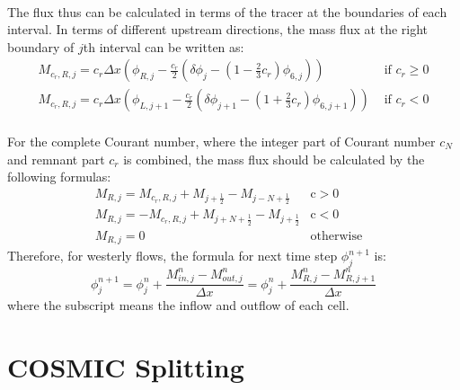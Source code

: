 \paragraph{}
The flux thus can be calculated in terms of the tracer at the boundaries of each interval. In terms of different upstream directions, the mass flux at the right boundary of $j$th interval can be written as:
\begin{eqnarray} \label{eq:2.10}
M_{c_r,R,j} = c_r \Delta x (\phi_{R,j}-\frac{c_r}{2}(\delta \phi_j-(1-\frac{2}{3} c_r)\phi_{6,j})) & \text{ if $c_r$}\geqslant 0 \nonumber \\
M_{c_r,R,j} = c_r \Delta x (\phi_{L,j+1}-\frac{c_r}{2}(\delta \phi_{j+1}-(1+\frac{2}{3} c_r)\phi_{6,j+1})) & \text{ if  $c_r$} < 0
\end{eqnarray}
\paragraph{}
For the complete Courant number, where the integer part of Courant number $c_N$ and remnant part $c_r$ is combined, the mass flux should be calculated by the following formulas:
\begin{eqnarray} \label{eq:2.11}
M_{R,j} = M_{c_r,R,j} + M_{j+\frac{1}{2}}-M_{j-N+\frac{1}{2}} & \text{c}>0 &\nonumber \\
M_{R,j} = -M_{c_r,R,j} +M_{j+N+\frac{1}{2}}- M_{j+\frac{1}{2}} & \text{c}<0 & \\
M_{R,j} = 0 & \text{otherwise} \nonumber 
\end{eqnarray}
Therefore, for westerly flows, the formula for next time step $\phi^{n+1}_j$ is: 
\begin{equation} \label{eq:2.12}
\phi^{n+1}_j = \phi^n_j + \frac{M^n_{in,j} - M^n_{out,j}}{\Delta x} = \phi^n_j + \frac{M^n_{R,j} - M^n_{R,j+1}}{\Delta x}
\end{equation}
where the subscript means the inflow and outflow of each cell.

\section{COSMIC Splitting}
\label{sec:COSMIC}

